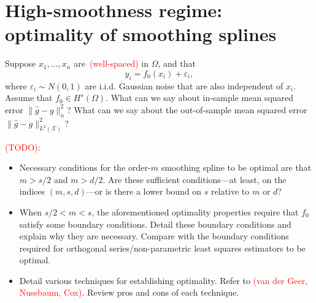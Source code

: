 \documentclass{article}
\newcommand{\1}{\mathbf{1}}
\newcommand{\mc}[1]{\mathcal{#1}}
\newcommand{\wh}[1]{\widehat{#1}}
\theoremstyle{alden}
\theoremstyle{aldenthm}
\theoremstyle{definition}
\theoremstyle{remark}
\begin{document}
\section{High-smoothness regime: optimality of smoothing splines}
Suppose $x_1,\ldots,x_n$ are~\textcolor{red}{(well-spaced)} in $\Omega$, and that
\begin{equation}
\label{model:regression}
y_i = f_0(x_i) + \varepsilon_i,
\end{equation}
where $\varepsilon_i \sim N(0,1)$ are i.i.d. Gaussian noise that are also independent of $x_i$. Assume that $f_0 \in H^s(\Omega)$. What can we say about in-sample mean squared error $\|\wh{g} - g\|_n^2$? What can we say about the out-of-sample mean squared error $\|\wh{g} - g\|_{L^2(\mc{X})}^2$?

\textcolor{red}{(TODO)}:
\begin{itemize}
	\item Necessary conditions for the order-$m$ smoothing spline to be optimal are that $m > s/2$ and $m > d/2$. Are these sufficient conditions---at least, on the indices $(m,s,d)$---or is there a lower bound on $s$ relative to $m$ or $d$?
	\item When $s/2 < m < s$, the aforementioned optimality properties require that $f_0$ satisfy some boundary conditions. Detail these boundary conditions and explain why they are necessary. Compare with the boundary conditions required for orthogonal series/non-parametric least squares estimators to be optimal.
 	\item Detail various techniques for establishing optimality. Refer to \textcolor{red}{(van der Geer, Nussbaum, Cox)}. Review pros and cons of each technique.
\end{itemize}
\end{document}
